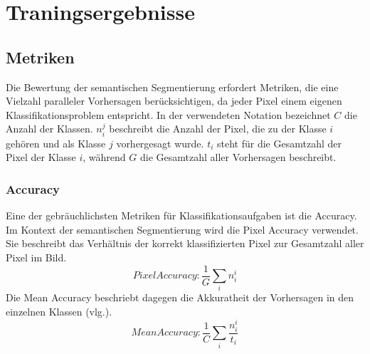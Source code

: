 \documentclass[12pt,DIV=15,BCOR=15mm,twoside,headsepline,abstract=true,listof=totoc,bibliography=totoc]{scrreprt}
\theoremstyle{remark}    %
\begin{document}
    \section{Traningsergebnisse}

    \subsection{Metriken}

    Die Bewertung der semantischen Segmentierung erfordert Metriken, die eine Vielzahl paralleler Vorhersagen berücksichtigen, da jeder Pixel einem eigenen 
    Klassifikationsproblem entspricht. 
    In der verwendeten Notation bezeichnet $C$ die Anzahl der Klassen. $n_i^j$ beschreibt die Anzahl der Pixel, die zu der Klasse $i$ gehören und als Klasse $j$ vorhergesagt wurde. 
    $t_i$ steht für die Gesamtzahl der Pixel der Klasse $i$, während $G$ die Gesamtzahl aller Vorhersagen beschreibt.\cite{csurka2023semanticimagesegmentationdecades}
    \subsubsection{Accuracy}
    Eine der gebräuchlichsten Metriken für Klassifikationsaufgaben ist die Accuracy.
    Im Kontext der semantischen Segmentierung wird die Pixel Accuracy verwendet. Sie beschreibt das Verhältnis der korrekt klassifizierten Pixel zur Gesamtzahl 
    aller Pixel im Bild.
    \begin{equation}
        Pixel Accuracy: \frac{1}{G} \sum_{i} n_i^i
    \end{equation}
    Die Mean Accuracy beschriebt dagegen die Akkuratheit der Vorhersagen in den einzelnen Klassen (vlg.\cite{csurka2023semanticimagesegmentationdecades}).
    \begin{equation}
        Mean Accuracy: \frac{1}{C} \sum_{i} \frac{n_{i}^i}{t_i}
    \end{equation}
\end{document}
